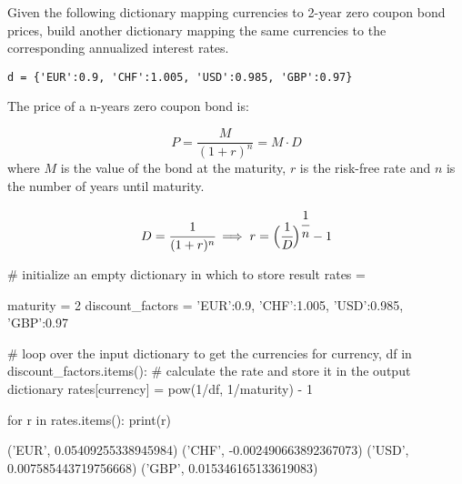 \begin{question}
Given the following dictionary mapping currencies to 2-year zero coupon bond prices, build another dictionary mapping the same currencies to the corresponding annualized interest rates.

\lstinline[language=iPython]|d = {'EUR':0.9, 'CHF':1.005, 'USD':0.985, 'GBP':0.97}|
\end{question}

\cprotEnv\begin{solution}
The price of a n-years zero coupon bond is:

\[ P = \frac{M}{(1+r)^{n}} = M\cdot D \]
where $M$ is the value of the bond at the maturity, $r$ is the risk-free rate and $n$ is the number of years until maturity.

\[ D = \cfrac{1}{(1+r)^{n}} \implies r = \Big(\cfrac{1}{D}\Big)^{\cfrac{1}{n}} - 1\]

\begin{ipython}
# initialize an empty dictionary in which to store result
rates = {}

maturity = 2
discount_factors = {'EUR':0.9, 'CHF':1.005, 'USD':0.985, 'GBP':0.97}

# loop over the input dictionary to get the currencies
for currency, df in discount_factors.items():
    # calculate the rate and store it in the output dictionary
    rates[currency] = pow(1/df, 1/maturity) - 1
   
for r in rates.items():
    print(r)
\end{ipython}
\begin{ioutput}
('EUR', 0.05409255338945984)
('CHF', -0.002490663892367073)
('USD', 0.007585443719756668)
('GBP', 0.015346165133619083)
\end{ioutput}
\end{solution}